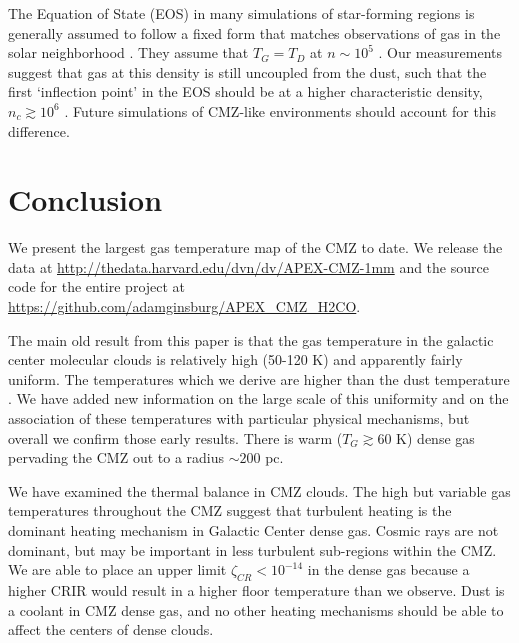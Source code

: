 The Equation of State (EOS) in many simulations of star-forming regions is
generally assumed to follow a fixed form that matches observations of gas in
the solar neighborhood \citep{Jappsen2005a,Bonnell2006b,Dale2012a}.  They
assume that $T_G = T_D$ at $n\sim10^5$ \percc.  Our measurements suggest that
gas at this density is still uncoupled from the dust, such that the first
`inflection point' in the EOS should be at a higher characteristic density,
$n_c\gtrsim10^6$ \percc.  Future simulations of CMZ-like environments should
account for this difference.

\section{Conclusion}
We present the largest gas temperature map of the CMZ to date.  We release the
data at \url{http://thedata.harvard.edu/dvn/dv/APEX-CMZ-1mm} and the source
code for the entire project at
\url{https://github.com/adamginsburg/APEX_CMZ_H2CO}.  

The main old result from this paper is that the gas temperature in the galactic
center molecular clouds is relatively high (50-120 K) and apparently fairly
uniform.  The temperatures which we derive are higher than the dust temperature
\citep[][see their conclusion]{Guesten1981a}.  We have added new information
on the large scale of this uniformity and on the association of these
temperatures with particular physical mechanisms, but overall we confirm those
early results.  There is warm ($T_G\gtrsim60$ K) dense gas pervading the CMZ out
to a radius $\sim200$ pc.

We have examined the thermal balance in CMZ clouds.
The high but variable gas temperatures throughout the CMZ suggest that
turbulent heating is the dominant heating mechanism in Galactic Center dense
gas.  Cosmic rays are not dominant, but may be important in less turbulent
sub-regions within the CMZ.  We are able to place an upper limit $\zeta_{CR}
< 10^{-14}$ \pers in the dense gas because a higher CRIR would result in a
higher floor temperature than we observe.  Dust is a coolant in CMZ dense gas,
and no other heating mechanisms should be able to affect the centers of dense
clouds.

